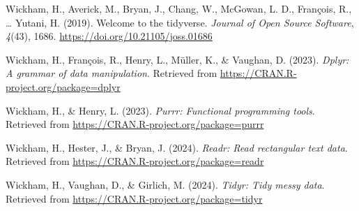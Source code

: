 \documentclass[
  man]{apa6}
\newlength{\cslhangindent}
\newenvironment{CSLReferences}[2] %
 {\begin{list}{}{%
  \setlength{\itemindent}{0pt}
  \setlength{\leftmargin}{0pt}
  \setlength{\parsep}{0pt}
  \ifodd #1
   \setlength{\leftmargin}{\cslhangindent}
   \setlength{\itemindent}{-1\cslhangindent}
  \fi
  \setlength{\itemsep}{#2\baselineskip}}}
 {\end{list}}
\begin{document}
\begin{CSLReferences}{1}{0}
Wickham, H., Averick, M., Bryan, J., Chang, W., McGowan, L. D., François, R., \ldots{} Yutani, H. (2019). Welcome to the {tidyverse}. \emph{Journal of Open Source Software}, \emph{4}(43), 1686. \url{https://doi.org/10.21105/joss.01686}

Wickham, H., François, R., Henry, L., Müller, K., \& Vaughan, D. (2023). \emph{Dplyr: A grammar of data manipulation}. Retrieved from \url{https://CRAN.R-project.org/package=dplyr}

Wickham, H., \& Henry, L. (2023). \emph{Purrr: Functional programming tools}. Retrieved from \url{https://CRAN.R-project.org/package=purrr}

Wickham, H., Hester, J., \& Bryan, J. (2024). \emph{Readr: Read rectangular text data}. Retrieved from \url{https://CRAN.R-project.org/package=readr}

Wickham, H., Vaughan, D., \& Girlich, M. (2024). \emph{Tidyr: Tidy messy data}. Retrieved from \url{https://CRAN.R-project.org/package=tidyr}

\end{CSLReferences}
\end{document}
